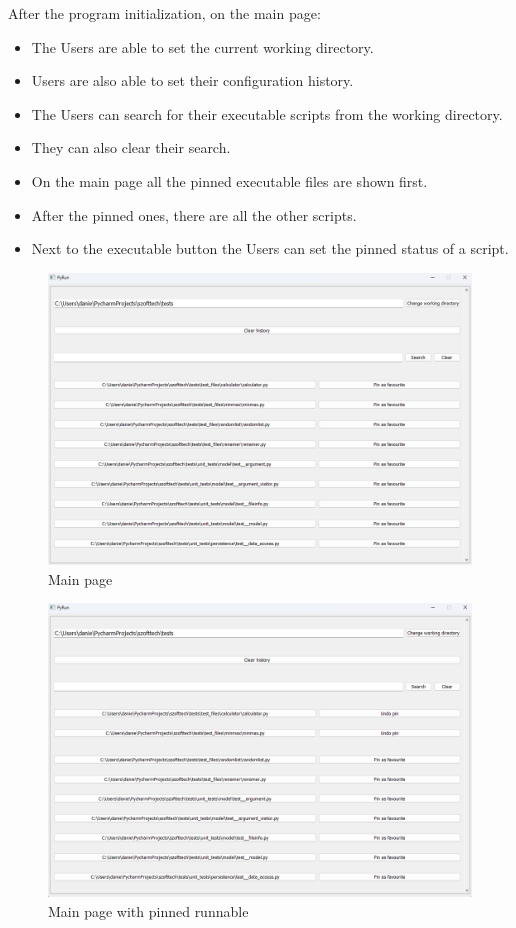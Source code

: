 \documentclass{article}
\begin{document}
After the program initialization, on the main page:
\begin{itemize}
    \item The Users are able to set the current working directory.
    \item Users are also able to set their configuration history.
    \item The Users can search for their executable scripts from the working directory.
    \item They can also clear their search.
    \item On the main page all the pinned executable files are shown first.
    \item After the pinned ones, there are all the other scripts.
    \item Next to the executable button the Users can set the pinned status of a script.
\end{itemize}

\begin{figure}[h]
    \centering
    \includegraphics[width=1\linewidth]{img/main_page.png}
    \caption{Main page}
    \label{fig:enter-label}
\end{figure}

\begin{figure}[h]
    \centering
    \includegraphics[width=1\linewidth]{img/pinned.png}
    \caption{Main page with pinned runnable}
    \label{fig:enter-label}
\end{figure}
\end{document}
